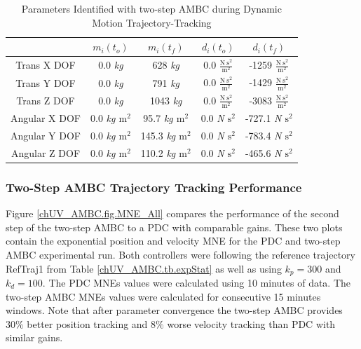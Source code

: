 \begin{table}[htbp]
\ssp
\caption{Parameters Identified with two-step \ac{AMBC} during 
  Dynamic Motion Trajectory-Tracking}
\begin{center}
\begin{tabular}{c|cccc}
 & $m_i(t_o)$ & $m_i(t_f)$ & $d_i(t_o)$ & $d_i(t_f)$ \\ \hline
Trans X \ac{DOF} & 0.0 {\it kg}& 628 {\it kg}& 0.0 {\it $\frac{\text{N}~\text{s}^2}{\text{m}^2}$}& -1259 {\it $\frac{\text{N}~\text{s}^2}{\text{m}^2}$}\\
Trans Y \ac{DOF} & 0.0 {\it kg}& 791 {\it kg}& 0.0 {\it $\frac{\text{N}~\text{s}^2}{\text{m}^2}$}& -1429 {\it $\frac{\text{N}~\text{s}^2}{\text{m}^2}$}\\
Trans Z \ac{DOF} & 0.0 {\it kg}&1043 {\it kg}& 0.0 {\it $\frac{\text{N}~\text{s}^2}{\text{m}^2}$}& -3083 {\it $\frac{\text{N}~\text{s}^2}{\text{m}^2}$}\\
Angular X \ac{DOF} & 0.0 {\it kg $\text{m}^2$}& 95.7 {\it kg $\text{m}^2$}& 0.0 {\it N $\text{s}^2$}& -727.1 {\it N $\text{s}^2$}\\
Angular Y \ac{DOF} & 0.0 {\it kg $\text{m}^2$}& 145.3 {\it kg $\text{m}^2$}& 0.0 {\it N $\text{s}^2$}& -783.4 {\it N $\text{s}^2$}\\
Angular Z \ac{DOF} & 0.0 {\it kg $\text{m}^2$}& 110.2 {\it kg $\text{m}^2$}& 0.0 {\it N $\text{s}^2$}& -465.6 {\it N $\text{s}^2$}\\
\end{tabular}
\end{center}
\label{chUV_AMBC.tb.dynParam}
\vspace*{-5mm}
\end{table}

\subsubsection{Two-Step \ac{AMBC} Trajectory Tracking Performance}

Figure \ref{chUV_AMBC.fig.MNE_All} compares the performance of the
second step of the two-step \ac{AMBC} to a \ac{PDC} with comparable
gains.  These two plots contain the exponential position and velocity
\ac{MNE} for the \ac{PDC} and two-step \ac{AMBC} experimental run.
Both controllers were following the reference trajectory RefTraj1 from
Table \ref{chUV_AMBC.tb.expStat} as well as using $k_p=300$ and
$k_d=100$.
%
The \ac{PDC} \acp{MNE} values were calculated using 10 minutes of
data.  
%
The two-step \ac{AMBC} \acp{MNE} values were calculated
for consecutive 15 minutes windows.
%
Note that after parameter convergence the two-step \ac{AMBC} provides
$30\%$ better position tracking and $8\%$ worse velocity tracking than
\ac{PDC} with similar gains.
%

